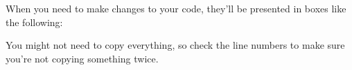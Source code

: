 	When you need to make changes to your code, they'll be presented in boxes like the following:

	
	
	You might not need to copy everything, so check the line numbers to make sure you're not copying something twice.
	